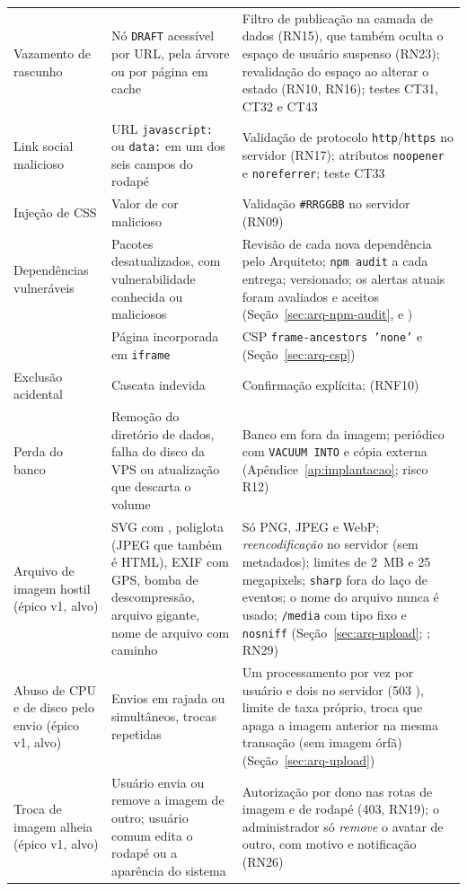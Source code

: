 \begin{longtable}{@{}L{3.3cm}L{4.4cm}L{5.4cm}@{}}
Vazamento de rascunho & Nó \texttt{DRAFT} acessível por URL, pela árvore ou por página em cache & Filtro de publicação na camada de dados (RN15), que também oculta o espaço de usuário suspenso (RN23); revalidação do espaço ao alterar o estado (RN10, RN16); testes CT31, CT32 e CT43\\[1pt]
Link social malicioso & URL \texttt{javascript:} ou \texttt{data:} em um dos seis campos do rodapé & Validação de protocolo \texttt{http}/\texttt{https} no servidor (RN17); atributos \texttt{noopener} e \texttt{noreferrer}; teste CT33\\[1pt]
Injeção de CSS & Valor de cor malicioso & Validação \texttt{\#RRGGBB} no servidor (RN09)\\[1pt]
Dependências vulneráveis & Pacotes desatualizados, com vulnerabilidade conhecida ou maliciosos & Revisão de cada nova dependência pelo Arquiteto; \texttt{npm audit} a cada entrega;  versionado; os alertas atuais foram avaliados e aceitos (Seção~\ref{sec:arq-npm-audit},  e )\\[1pt]
 & Página incorporada em \texttt{iframe} & CSP \texttt{frame-ancestors 'none'} e  (Seção~\ref{sec:arq-csp})\\[1pt]
Exclusão acidental & Cascata indevida & Confirmação explícita;  (RNF10)\\[1pt]
Perda do banco & Remoção do diretório de dados, falha do disco da VPS ou atualização que descarta o volume & Banco em  fora da imagem;  periódico com \texttt{VACUUM INTO} e cópia externa (Apêndice~\ref{ap:implantacao}; risco R12)\\[1pt]
Arquivo de imagem hostil (épico v1, alvo) & SVG com , poliglota (JPEG que também é HTML), EXIF com GPS, bomba de descompressão, arquivo gigante, nome de arquivo com caminho & Só PNG, JPEG e WebP; \emph{reencodificação} no servidor (sem metadados); limites de 2~MB e 25 megapixels; \texttt{sharp} fora do laço de eventos; o nome do arquivo nunca é usado; \texttt{/media} com tipo fixo e \texttt{nosniff} (Seção~\ref{sec:arq-upload}; ; RN29)\\[1pt]
Abuso de CPU e de disco pelo envio (épico v1, alvo) & Envios em rajada ou simultâneos, trocas repetidas & Um processamento por vez por usuário e dois no servidor (503 ), limite de taxa próprio, troca que apaga a imagem anterior na mesma transação (sem imagem órfã) (Seção~\ref{sec:arq-upload})\\[1pt]
Troca de imagem alheia (épico v1, alvo) & Usuário envia ou remove a imagem de outro; usuário comum edita o rodapé ou a aparência do sistema & Autorização por dono nas rotas de imagem e de rodapé (403, RN19); o administrador só \emph{remove} o avatar de outro, com motivo e notificação (RN26)\\[1pt]
\end{longtable}


